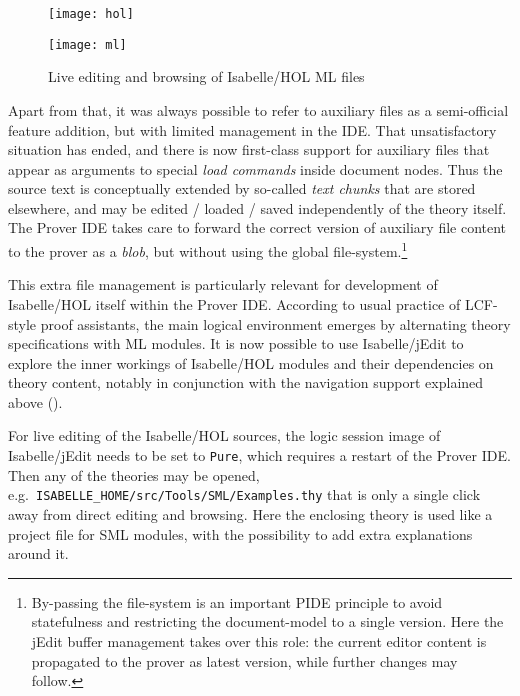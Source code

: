 \begin{isabellebody}
\begin{isamarkuptext}
\begin{figure}[!htbp]
\begin{center}
\texttt{[image: hol]}

\vspace*{1ex}

\texttt{[image: ml]}
\end{center}
\caption{Live editing and browsing of Isabelle/HOL ML files}
\label{fig:ml}
\end{figure}

Apart from that, it was always possible to refer to auxiliary files as a
semi-official feature addition, but with limited management in the IDE. That
unsatisfactory situation has ended, and there is now first-class support for
auxiliary files that appear as arguments to special \emph{load commands}
inside document nodes. Thus the source text is conceptually extended by
so-called \emph{text chunks} that are stored elsewhere, and may be edited /
loaded / saved independently of the theory itself. The Prover IDE takes care
to forward the correct version of auxiliary file content to the prover as a
\emph{blob}, but without using the global file-system.\footnote{By-passing
the file-system is an important PIDE principle to avoid statefulness and
restricting the document-model to a single version. Here the jEdit buffer
management takes over this role: the current editor content is propagated to
the prover as latest version, while further changes may follow.}

\medskip This extra file management is particularly relevant for development
of Isabelle/HOL itself within the Prover IDE. According to usual practice of
LCF-style proof assistants, the main logical environment emerges by
alternating theory specifications with ML modules. It is now possible to use
Isabelle/jEdit to explore the inner workings of Isabelle/HOL modules and
their dependencies on theory content, notably in conjunction with the
navigation support explained above ().

For live editing of the Isabelle/HOL sources, the logic session image of
Isabelle/jEdit needs to be set to \verb|Pure|, which requires a restart
of the Prover IDE. Then any of the theories may be opened, e.g.\ \verb|ISABELLE_HOME|\verb|/|\discretionary{}{}{}\verb|src|\verb|/|\discretionary{}{}{}\verb|Tools|\verb|/|\discretionary{}{}{}\verb|SML|\verb|/|\discretionary{}{}{}\verb|Examples.thy| that is
only a single click away from direct editing and browsing. Here the
enclosing theory is used like a project file for SML modules, with the
possibility to add extra explanations around it.


\end{isamarkuptext}
\end{isabellebody}
